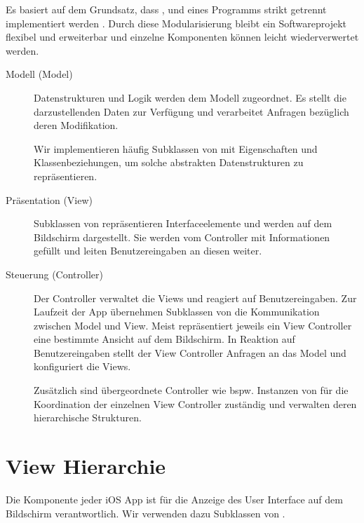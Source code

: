 \documentclass[parskip=half, final]{scrreprt}
\begin{document}
Es basiert auf dem Grundsatz, dass ,  und  eines Programms strikt getrennt implementiert werden . Durch diese Modularisierung bleibt ein Softwareprojekt flexibel und erweiterbar und einzelne Komponenten können leicht wiederverwertet werden.


\begin{description}
\item[Modell (Model)] Datenstrukturen und Logik werden dem Modell zugeordnet. Es stellt die darzustellenden Daten zur Verfügung und verarbeitet Anfragen bezüglich deren Modifikation.

Wir implementieren häufig Subklassen von  mit Eigenschaften und Klassenbeziehungen, um solche abstrakten Datenstrukturen zu repräsentieren.

\item[Präsentation (View)] Subklassen von  repräsentieren Interfaceelemente und werden auf dem Bildschirm dargestellt. Sie werden vom Controller mit Informationen gefüllt und leiten Benutzereingaben an diesen weiter. 

\item[Steuerung (Controller)] Der Controller verwaltet die Views und reagiert auf Benutzereingaben. Zur Laufzeit der App übernehmen Subklassen von  die Kommunikation zwischen Model und View. Meist repräsentiert jeweils ein View Controller eine bestimmte Ansicht auf dem Bildschirm. In Reaktion auf Benutzereingaben stellt der View Controller Anfragen an das Model und konfiguriert die Views.

Zusätzlich sind übergeordnete Controller wie bspw. Instanzen von  für die Koordination der einzelnen View Controller zuständig und verwalten deren hierarchische Strukturen.
\end{description}


\section{View Hierarchie}

\mvcindicatorview

Die  Komponente jeder iOS App ist für die Anzeige des User Interface auf dem Bildschirm verantwortlich. Wir verwenden dazu Subklassen von .
\end{document}
